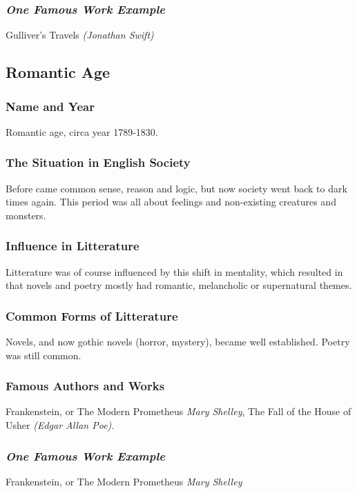 \subsubsection{\textit{One Famous Work Example}}
Gulliver's Travels \textit{(Jonathan Swift)}

\newpage
\subsection{Romantic Age}

\subsubsection{Name and Year}
Romantic age, circa year 1789-1830.

\subsubsection{The Situation in English Society}
Before came common sense, reason and logic, but now society went back to dark times again. This period was all about feelings and non-existing creatures and monsters.

\subsubsection{Influence in Litterature}
Litterature was of course influenced by this shift in mentality, which resulted in that novels and poetry mostly had romantic, melancholic or supernatural themes.

\subsubsection{Common Forms of Litterature}
Novels, and now gothic novels (horror, mystery), became well established. Poetry was still common.

\subsubsection{Famous Authors and Works}
Frankenstein, or The Modern Prometheus \textit{Mary Shelley}, The Fall of the House of Usher \textit{(Edgar Allan Poe)}.


\subsubsection{\textit{One Famous Work Example}}
Frankenstein, or The Modern Prometheus \textit{Mary Shelley}

